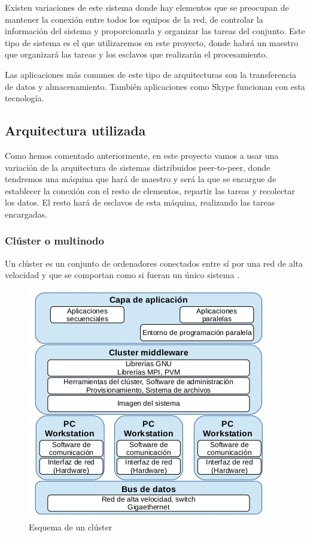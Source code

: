 Existen variaciones de este sistema donde hay elementos que se preocupan de mantener la conexión entre todos los equipos de la red, de controlar la información del sistema y proporcionarla y organizar las tareas del conjunto. Este tipo de sistema es el que utilizaremos en este proyecto, donde habrá un maestro que organizará las tareas y los esclavos que realizarán el procesamiento.

Las aplicaciones más comunes de este tipo de arquitecturas son la transferencia de datos y almacenamiento. También aplicaciones como Skype funcionan con esta tecnología.

\subsection{Arquitectura utilizada}
Como hemos comentado anteriormente, en este proyecto vamos a usar una variación de la arquitectura de sistemas distribuidos peer-to-peer, donde tendremos una máquina que hará de maestro y será la que se encargue de establecer la conexión con el resto de elementos, repartir las tareas y recolectar los datos. El resto hará de esclavos de esta máquina, realizando las tareas encargadas.

\subsubsection{Clúster o multinodo}
Un clúster es un conjunto de ordenadores conectados entre sí por una red de alta velocidad y que se comportan como si fueran un único sistema \cite{cluster}. 

\begin{figure}[htp!]
	\centering
	\caption{Esquema de un clúster \cite{clusterfoto}}
	\label{clusterDef}
	\vspace{5pt}
	\includegraphics[scale=0.7]{graphics/clusterDef}
\end{figure}


